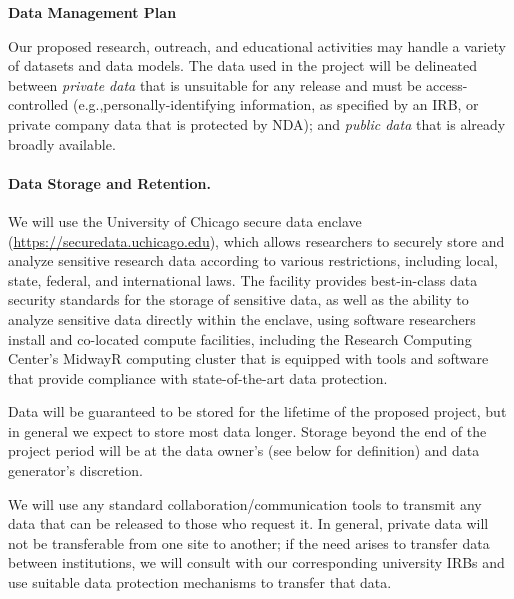 \begin{center}
{\large \bf \TITLE}
\end{center}

\begin{center}
    {\bf Data Management Plan}
\end{center}

Our proposed research, outreach, and educational activities may handle a
variety of datasets and data models.  The data used in the project will be
delineated between \emph{private data} that is unsuitable for any release and
must be access-controlled (e.g.,personally-identifying information, as
specified by an IRB, or private company data that is protected by NDA); and
\emph{public data} that is already broadly available.

\paragraph{Data Storage and Retention.} We will use the University of
Chicago secure data enclave (\url{https://securedata.uchicago.edu}), which
allows researchers to securely store and analyze sensitive research data
according to various restrictions, including local, state, federal, and
international laws. The facility provides best-in-class data security
standards for the storage of sensitive data, as well as the ability to
analyze sensitive data directly within the enclave, using software
researchers install and co-located compute facilities, including the
Research Computing Center's MidwayR computing cluster that is equipped
with tools and software that provide compliance with state-of-the-art
data protection.

Data will be guaranteed to be stored for the lifetime of the proposed
project, but in general we expect to store most data longer. Storage
beyond the end of the project period will be at the data owner's (see
below for definition) and data generator's discretion.

We will use any standard collaboration/communication tools to transmit
any data that can be released to those who request it. In general,
private data will not be transferable from one site to another; if the
need arises to transfer data between institutions, we will consult with
our corresponding university IRBs and use suitable data protection
mechanisms to transfer that data.

